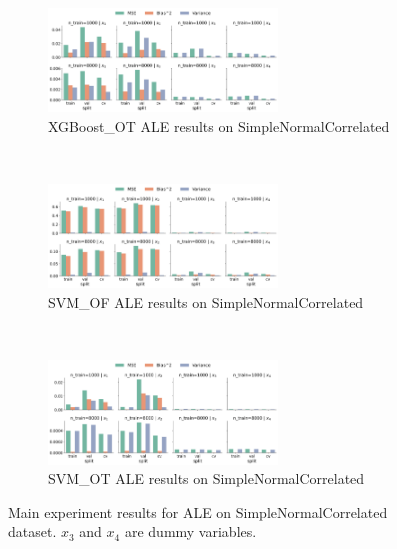 \documentclass[runningheads]{llncs}
\begin{document}
\begin{figure}[h!]
    \ContinuedFloat\
    \centering
    \begin{subfigure}[b]{\textwidth}
        \centering
        \includegraphics[width=0.67\textwidth]{img/SNC-all/feature_effect_errors_ale_XGBoost_OT.png}
        \caption{XGBoost\_OT ALE results on SimpleNormalCorrelated}
    \end{subfigure}
    \\[10pt]
    \vfill
    \begin{subfigure}[b]{\textwidth}
        \centering
        \includegraphics[width=0.67\textwidth]{img/SNC-all/feature_effect_errors_ale_SVM_OF.png}
        \caption{SVM\_OF ALE results on SimpleNormalCorrelated}
    \end{subfigure}
    \\[10pt]
    \vfill
    \begin{subfigure}[b]{\textwidth}
        \centering
        \includegraphics[width=0.67\textwidth]{img/SNC-all/feature_effect_errors_ale_SVM_OT.png}
        \caption{SVM\_OT ALE results on SimpleNormalCorrelated}
    \end{subfigure}
    \caption{Main experiment results for ALE on SimpleNormalCorrelated dataset. $x_3$ and $x_4$ are dummy variables.}
    \label{fig:ale-results-snc-all}  %
\end{figure}
\end{document}
